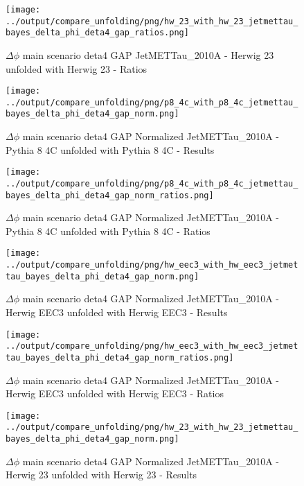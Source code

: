\documentclass[11pt]{book}
\begin{document}
\begin{figure}[ht]
\centering
\texttt{[image: ../output/compare\_unfolding/png/hw\_23\_with\_hw\_23\_jetmettau\_bayes\_delta\_phi\_deta4\_gap\_ratios.png]}
\caption{$\Delta\phi$ main scenario deta4 GAP JetMETTau\_2010A - Herwig 23 unfolded with Herwig 23 - Ratios}
\label{hw_23_hw_23_jetmettau_bayes_delta_phi_deta4_gap_b}
\end{figure}


\begin{figure}[ht]
\centering
\texttt{[image: ../output/compare\_unfolding/png/p8\_4c\_with\_p8\_4c\_jetmettau\_bayes\_delta\_phi\_deta4\_gap\_norm.png]}
\caption{$\Delta\phi$ main scenario deta4 GAP Normalized JetMETTau\_2010A - Pythia 8 4C unfolded with Pythia 8 4C - Results}
\label{p8_p8_jetmettau_bayes_delta_phi_deta4_gap_norm_a}
\end{figure}

\begin{figure}[ht]
\centering
\texttt{[image: ../output/compare\_unfolding/png/p8\_4c\_with\_p8\_4c\_jetmettau\_bayes\_delta\_phi\_deta4\_gap\_norm\_ratios.png]}
\caption{$\Delta\phi$ main scenario deta4 GAP Normalized JetMETTau\_2010A - Pythia 8 4C unfolded with Pythia 8 4C - Ratios}
\label{p8_p8_jetmettau_bayes_delta_phi_deta4_gap_norm_b}
\end{figure}

\begin{figure}[ht]
\centering
\texttt{[image: ../output/compare\_unfolding/png/hw\_eec3\_with\_hw\_eec3\_jetmettau\_bayes\_delta\_phi\_deta4\_gap\_norm.png]}
\caption{$\Delta\phi$ main scenario deta4 GAP Normalized JetMETTau\_2010A - Herwig EEC3 unfolded with Herwig EEC3 - Results}
\label{hw_eec3_hw_eec3_jetmettau_bayes_delta_phi_deta4_gap_norm_a}
\end{figure}

\begin{figure}[ht]
\centering
\texttt{[image: ../output/compare\_unfolding/png/hw\_eec3\_with\_hw\_eec3\_jetmettau\_bayes\_delta\_phi\_deta4\_gap\_norm\_ratios.png]}
\caption{$\Delta\phi$ main scenario deta4 GAP Normalized JetMETTau\_2010A - Herwig EEC3 unfolded with Herwig EEC3 - Ratios}
\label{hw_eec3_hw_eec3_jetmettau_bayes_delta_phi_deta4_gap_norm_b}
\end{figure}

\begin{figure}[ht]
\centering
\texttt{[image: ../output/compare\_unfolding/png/hw\_23\_with\_hw\_23\_jetmettau\_bayes\_delta\_phi\_deta4\_gap\_norm.png]}
\caption{$\Delta\phi$ main scenario deta4 GAP Normalized JetMETTau\_2010A - Herwig 23 unfolded with Herwig 23 - Results}
\label{hw_23_hw_23_jetmettau_bayes_delta_phi_deta4_gap_norm_a}
\end{figure}
\end{document}
